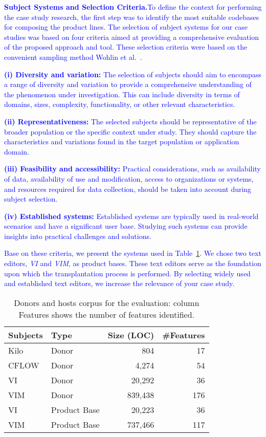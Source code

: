 \textcolor{blue}{\textbf{Subject Systems and Selection Criteria.}To define the context for performing the case study research, the first step was to identify the most suitable codebases for composing the product lines. The selection of subject systems for our case studies was based on four criteria aimed at providing a comprehensive evaluation of the proposed approach and tool. These selection criteria were based on the convenient sampling method Wohlin et al.~\cite{Wohlin2012}.}

\textcolor{blue}{\textbf{(i) Diversity and variation:} The selection of subjects should aim to encompass a range of diversity and variation to provide a comprehensive understanding of the phenomenon under investigation. This can include diversity in terms of domains, sizes, complexity, functionality, or other relevant characteristics.}

\textcolor{blue}{\textbf{(ii) Representativeness:} The selected subjects should be representative of the broader population or the specific context under study. They should capture the characteristics and variations found in the target population or application domain.}

\textcolor{blue}{\textbf{(iii) Feasibility and accessibility:} Practical considerations, such as availability of data, availability of use and modification, access to organizations or systems, and resources required for data collection, should be taken into account during subject selection.}

\textcolor{blue}{\textbf{(iv) Established systems:} Established systems are typically used in real-world scenarios and have a significant user base. Studying such systems can provide insights into practical challenges and solutions.}

\textcolor{blue}{Base on these criteria, we present the systems used in Table~\ref{tab:donors_list}. We chose two text editors, \emph{VI} and \emph{VIM}, as product bases. These text editors serve as the foundation upon which the transplantation process is performed. By selecting widely used and established text editors, we increase the relevance of your case study.}

\begin{table}[t]
\centering 
	\caption{Donors and hosts corpus for the evaluation: column Features shows the number of features identified. 
	}
	\label{tab:donors_list}
	\begin{tabular}{llrr} \hline
        Subjects &Type  & Size (LOC) & \#Features   \\\hline
	    Kilo     &Donor & 804        & 17      \\
		CFLOW    &Donor & 4,274      & 54      \\
		VI       &Donor & 20,292     & 36      \\
		VIM      &Donor & 839,438    & 176      \\\hline
		VI       &Product Base & 20,223 & 36      \\
		VIM      &Product Base & 737,466 & 117     \\\hline
	\end{tabular}
\end{table}

